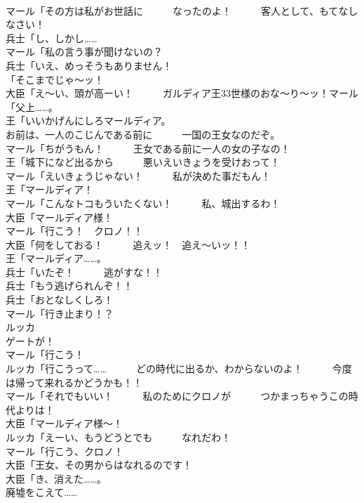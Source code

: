 \documentclass[8pt]{extreport}
\begin{document}
\begin{CJK}{UTF8}{min}
\\	マール「その方は私がお世話に　　　なったのよ！　　　客人として、もてなしなさい！	
\\	兵士「し、しかし……	
\\	マール「私の言う事が聞けないの？	
\\	兵士「いえ、めっそうもありません！	
\\	「そこまでじゃ～ッ！	
\\	大臣「え～い、頭が高ーい！　　　ガルディア王33世様のおな～り～ッ！マール「父上……。	
\\	王「いいかげんにしろマールディア。	
\\	お前は、一人のこじんである前に　　　一国の王女なのだぞ。	
\\	マール「ちがうもん！　　　王女である前に一人の女の子なの！	
\\	王「城下になど出るから　　　悪いえいきょうを受けおって！	
\\	マール「えいきょうじゃない！　　　私が決めた事だもん！	
\\	王「マールディア！	
\\	マール「こんなトコもういたくない！　　　私、城出するわ！	
\\	大臣「マールディア様！	
\\	マール「行こう！　クロノ！！	
\\	大臣「何をしておる！　　　追えッ！　追え～いッ！！	
\\	王「マールディア……。	
\\	兵士「いたぞ！　　　逃がすな！！	
\\	兵士「もう逃げられんぞ！！	
\\	兵士「おとなしくしろ！	
\\	マール「行き止まり！？	
\\	ルッカ
\\	ゲートが！	
\\	マール「行こう！	
\\	ルッカ「行こうって……　　　どの時代に出るか、わからないのよ！　　　今度は帰って来れるかどうかも！！	
\\	マール「それでもいい！　　　私のためにクロノが　　　つかまっちゃうこの時代よりは！	
\\	大臣「マールディア様～！	
\\	ルッカ「えーい、もうどうとでも　　　なれだわ！	
\\	マール「行こう、クロノ！	
\\	大臣「王女、その男からはなれるのです！	
\\	大臣「き、消えた……。	
\\	廃墟をこえて……	

\end{CJK}
\end{document}
